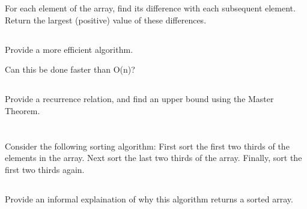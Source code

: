 \documentclass{amsart}
\theoremstyle{definition}
\theoremstyle{remark}
\numberwithin{equation}{section}
\begin{document}
For each element of the array, find its difference with each subsequent element. Return the largest (positive) value of these differences.

\subsection{} Provide a more efficient algorithm.

Can this be done faster than O(n)?

\subsection{} Provide a recurrence relation, and find an upper bound
using the Master Theorem.

\section{} Consider the following sorting algorithm: First sort the
first two thirds of the elements in the array. Next sort the last two
thirds of the array. Finally, sort the first two thirds again.

\subsection{} Provide an informal explaination of why this algorithm returns a
sorted array.



\subsection*{}
\end{document}
